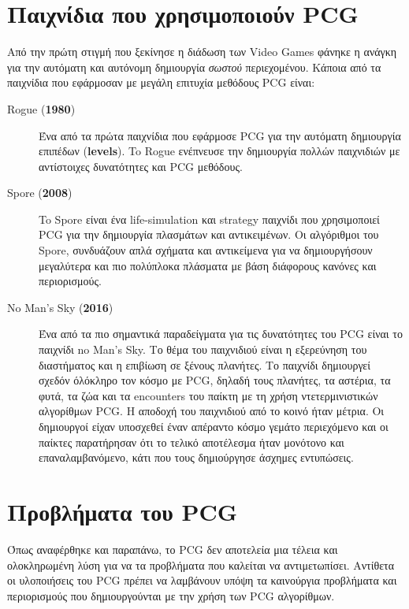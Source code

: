 \section{Παιχνίδια που χρησιμοποιούν PCG}

Από την πρώτη στιγμή που ξεκίνησε η διάδωση των Video Games φάνηκε η ανάγκη για την αυτόματη και αυτόνομη δημιουργία   \textit{σωστού} περιεχομένου. Κάποια από τα παιχνίδια που εφάρμοσαν με μεγάλη επιτυχία μεθόδους PCG είναι:

\begin{description}
\item [Rogue (\textbf{1980})] Ένα από τα πρώτα παιχνίδια που εφάρμοσε PCG για την αυτόματη δημιουργία επιπέδων (\textbf{levels}). To Rogue ενέπνευσε την δημιουργία πολλών παιχνιδιών με αντίστοιχες δυνατότητες και PCG μεθόδους. \cite{rogue}

\item [Spore (\textbf{2008})] To Spore είναι ένα life-simulation και strategy παιχνίδι που χρησιμοποιεί PCG για την δημιουργία πλασμάτων και αντικειμένων. Οι αλγόριθμοι του Spore, συνδυάζουν απλά σχήματα και αντικείμενα για να δημιουργήσουν μεγαλύτερα και πιο πολύπλοκα πλάσματα με βάση διάφορους κανόνες και περιορισμούς. \cite{spore} 

\item [No Man's Sky (\textbf{2016})] Ένα από τα πιο σημαντικά παραδείγματα για τις δυνατότητες του PCG είναι το παιχνίδι no Man's Sky. Το θέμα του παιχνιδιού είναι η εξερεύνηση του διαστήματος και η επιβίωση σε ξένους πλανήτες. Το παιχνίδι δημιουργεί σχεδόν όλόκληρο τον κόσμο με PCG, δηλαδή τους πλανήτες, τα αστέρια, τα φυτά, τα ζώα και τα encounters του παίκτη με τη χρήση ντετερμινιστικών αλγορίθμων PCG. Η αποδοχή του παιχνιδιού από το κοινό ήταν μέτρια. Οι δημιουργοί είχαν υποσχεθεί έναν απέραντο κόσμο γεμάτο περιεχόμενο και οι παίκτες παρατήρησαν ότι το τελικό αποτέλεσμα ήταν μονότονο και επαναλαμβανόμενο, κάτι που τους δημιούργησε άσχημες εντυπώσεις.  \cite{nomanssky}
\end{description}

\section{Προβλήματα του PCG}
Όπως αναφέρθηκε και παραπάνω, το PCG δεν αποτελεία μια τέλεια και ολοκληρωμένη λύση για να τα προβλήματα που καλείται να αντιμετωπίσει. Αντίθετα οι υλοποιήσεις του PCG πρέπει να λαμβάνουν υπόψη τα καινούργια προβλήματα και περιορισμούς που δημιουργούνται με την χρήση των PCG αλγορίθμων. \cite{challenges} \cite{desirableproperties}

